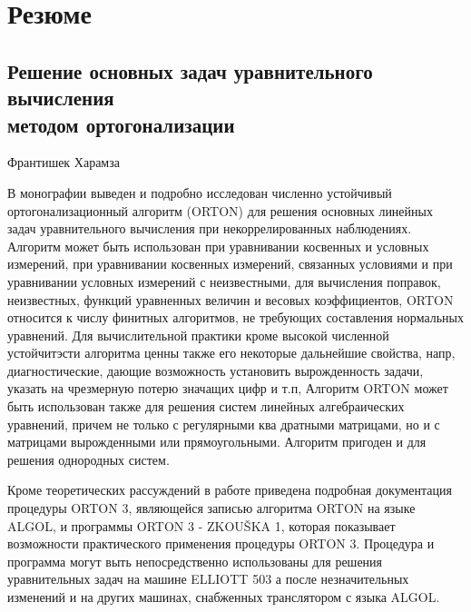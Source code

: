 
\chapter*{Резюме}
\section*{Решение основных задач
          уравнительного вычисления\\
          методом ортогонализации}
\begin{center}
          Франтишек Харамза
\end{center}

\noindent
В монографии выведен и подробно исследован численно
устойчивый ортогонализационный алгоритм (ORTON) для решения
основных линейных задач уравнительного вычисления при
некоррелированных наблюдениях. Алгоритм может быть использован при
уравнивании косвенных и условных измерений, при уравнивании
косвенных измерений, связанных условиями и при уравнивании
условных измерений с неизвестными, для вычисления поправок,
неизвестных, функций уравненных величин и весовых коэффициентов,
ORTON относится к числу финитных алгоритмов, не требующих
составления нормальных уравнений. Для вычислительной практики кроме
высокой численной устойчитэсти алгоритма ценны также его
некоторые дальнейшие свойства, напр, диагностические, дающие
возможность установить вырожденность задачи, указать на
чрезмерную потерю значащих цифр и т.п, Алгоритм ORTON может быть
использован также для решения систем линейных алгебраических
уравнений, причем не только с регулярными ква дратными
матрицами, но и с матрицами вырожденными или прямоугольными.
Алгоритм пригоден и для решения однородных систем.

Кроме теоретических рассуждений в работе приведена
подробная документация процедуры ORTON 3, являющейся записью
алгоритма ORTON на языке ALGOL, и программы ORTON 3 - ZKOUŠKA 1,
которая показывает возможности практического применения
процедуры ORTON 3. Процедура и программа могут выть
непосредственно использованы для решения уравнительных задач
на машине ELLIOTT 503 а после незначительных изменений и на других
машинах, снабженных транслятором с языка ALGOL.
